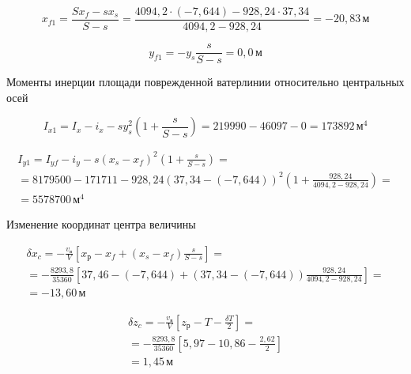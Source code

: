 \begin{equation*}
    x_{f1} = \frac{S x_f - s x_s}{S - s} = \frac{4094{,}2 \cdot (-7{,}644) - 928{,}24 \cdot 37{,}34}{4094{,}2 - 928{,}24} = -20{,}83\,\text{м}
\end{equation*}

\begin{equation*}
    y_{f1} = - y_s \frac{s}{S - s} = 0{,}0\,\text{м}
\end{equation*}

Моменты инерции площади поврежденной ватерлинии относительно центральных осей

\begin{equation*}
    I_{x1} = I_x - i_x - s y_s^2 (1 + \frac{s}{S-s}) = 219990 - 46097 - 0 = 173892\,\text{м}^4
\end{equation*}

\begin{equation*}
    \begin{split}
    I_{y1} = I_{yf} - i_y - s (x_s - x_f)^2 (1 + \frac{s}{S-s}) = \\
    =  8179500 - 171711 - 928{,}24 (37{,}34 - (-7{,}644))^2(1 + \frac{928{,}24}{4094{,}2 - 928{,}24}) = \\
    = 5578700\,\text{м}^4
    \end{split}
\end{equation*}

Изменение координат центра величины

\begin{equation*}
    \begin{split}
    \delta x_c = - \frac{v_{\text{в}}}{V} [x_{\text{р}} - x_f + (x_s - x_f)\frac{s}{S-s}] = \\
    = - \frac{8293{,}8}{35360}[37{,}46 - (-7{,}644) + (37{,}34 - (-7{,}644))\frac{928{,}24}{4094{,}2 - 928{,}24}] = \\
    = - 13{,}60\,\text{м}
    \end{split}
\end{equation*}

\begin{equation*}
    \begin{split}
    \delta z_c = - \frac{v_{\text{в}}}{V} [z_{\text{р}} - T - \frac{\delta T}{2}] = \\
    = - \frac{8293{,}8}{35360}[5{,}97 - 10{,}86 - \frac{2{,}62}{2}]\\
    = 1{,}45\,\text{м}
    \end{split}
\end{equation*}

